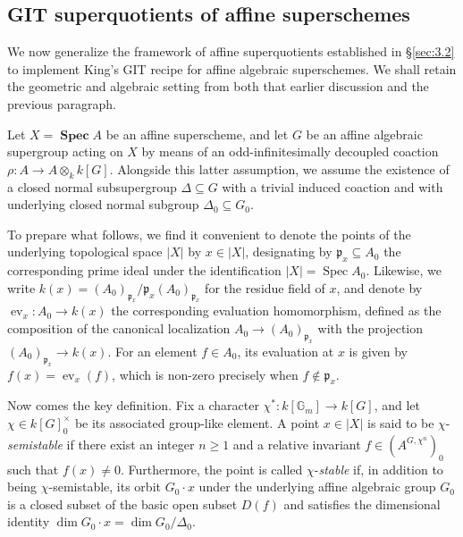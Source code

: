 \documentclass[11pt,a4paper,reqno,noamsfonts]{amsart}
\numberwithin{equation}{section}
\theoremstyle{definition}
\theoremstyle{remark}
\newcommand{\pfrak}{\ensuremath{\mathfrak{p}}}
\DeclareMathOperator{\ev}{ev}
\DeclareMathOperator{\Spec}{Spec}
\DeclareMathOperator{\sSpec}{\mathbf{Spec}}
\begin{document}
\subsection{GIT superquotients of affine superschemes}
We now generalize the framework of affine superquotients established in \S\ref{sec:3.2} to implement King's GIT recipe for affine algebraic superschemes. We shall retain the geometric and algebraic setting from both that earlier discussion and the previous paragraph.

Let $X = \sSpec A$ be an affine superscheme, and let $G$ be an affine algebraic supergroup acting on $X$ by means of an odd-infinitesimally decoupled coaction $\rho \colon A \to A \otimes_k k[G]$. Alongside this latter assumption, we assume the existence of a closed normal subsupergroup $\Delta \subseteq G$ with a trivial induced coaction and with underlying closed normal subgroup $\Delta_0 \subseteq G_0$.

To prepare what follows, we find it convenient to denote the points of the underlying topological space $\lvert X \rvert$ by $x \in \lvert X \rvert$, designating by $\pfrak_x \subseteq A_0$ the corresponding prime ideal under the identification $\lvert X \rvert = \Spec A_0$. Likewise, we write $k(x) = (A_0)_{\pfrak_x} / \pfrak_x (A_0)_{\pfrak_x}$ for the residue field of $x$, and denote by $\ev_x \colon A_0 \to k(x)$ the corresponding evaluation homomorphism, defined as the composition of the canonical localization $A_0 \to (A_0)_{\pfrak_x}$ with the projection $(A_0)_{\pfrak_x} \to k(x)$. For an element $f \in A_0$, its evaluation at $x$ is given by $f(x) = \ev_x(f)$, which is non-zero precisely when $f \notin \pfrak_x$.

Now comes the key definition. Fix a character $\chi^{*} \colon k[\mathbb{G}_m] \to k[G]$, and let $\chi \in k[G]_0^{\times}$ be its associated group-like element. A point $x \in \lvert X \rvert$ is said to be $\chi$-\emph{semistable} if there exist an integer $n \geq 1$ and a relative invariant $f \in (A^{G,\chi^n})_0$ such that $f(x) \neq 0$. Furthermore, the point is called $\chi$-\emph{stable} if, in addition to being $\chi$-semistable, its orbit $G_0 \cdot x$ under the underlying affine algebraic group $G_{0}$ is a closed subset of the basic open subset $D(f)$ and satisfies the dimensional identity $\dim G_0 \cdot x = \dim G_0 / \Delta_0$.
\end{document}
